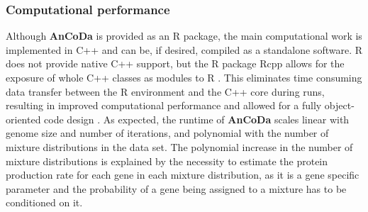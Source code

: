 \documentclass{bioinfo}
\newcommand{\package}{\textbf{AnCoDa }} %
\begin{document}
\subsubsection*{Computational performance}
Although \package is provided as an R package, the main computational work is implemented in C++ and can be, if desired, compiled as a standalone software.
R does not provide native C++ support, but the R package Rcpp allows for the exposure of whole C++ classes as modules to R \citep{rcpp_package}.
This eliminates time consuming data transfer between the R environment and the C++ core during runs, resulting in improved computational performance and allowed for a fully object-oriented code design \cite{ood_book}. 
As expected, the runtime of \package scales linear with genome size and number of iterations, and polynomial with the number of mixture distributions in the data set. The polynomial increase in the number of mixture distributions is explained by the necessity to estimate the protein production rate for each gene in each mixture distribution, as it is a gene specific parameter and the probability of a gene being assigned to a mixture has to be conditioned on it.



\end{document}
